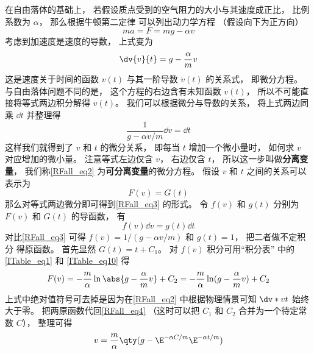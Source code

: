 

在自由落体的基础上， 若假设质点受到的空气阻力的大小与其速度成正比， 比例系数为 $\alpha$， 那么根据牛顿第二定律 可以列出动力学方程 （假设向下为正方向）
\begin{equation}
ma = F = mg - \alpha v
\end{equation}
考虑到加速度是速度的导数， 上式变为
\begin{equation}\label{RFall_eq2}
\dv{v}{t} = g - \frac{\alpha}{m} v
\end{equation}
这是速度关于时间的函数 $v(t)$ 与其一阶导数 $\dot v(t)$ 的关系式， 即微分方程。 与自由落体问题不同的是， 这个方程的右边含有未知函数 $v(t)$， 所以不可能直接将等式两边积分解得 $v(t)$。 我们可以根据微分与导数的关系， 将上式两边同乘 $\dd{t}$ 并整理得
\begin{equation}\label{RFall_eq3}
\frac{1}{g - \alpha v/m} \dd{v} = \dd{t}
\end{equation}
这样我们就得到了 $v$ 和 $t$ 的微分关系， 即每当 $t$ 增加一个微小量时， 如何求 $v$ 对应增加的微小量。 注意等式左边仅含 $v$， 右边仅含 $t$， 所以这一步叫做\textbf{分离变量}， 我们称\autoref{RFall_eq2} 为\textbf{可分离变量}的微分方程。 假设 $v$ 和 $t$ 之间的关系可以表示为
\begin{equation}\label{RFall_eq4}
F(v) = G(t)
\end{equation}
那么对等式两边微分即可得到\autoref{RFall_eq3} 的形式。 令 $f(v)$ 和 $g(t)$ 分别为 $F(v)$ 和 $G(t)$ 的导函数， 有
\begin{equation}\label{RFall_eq5}
f(v) \dd{v} = g(t) \dd{t}
\end{equation}
对比\autoref{RFall_eq3} 可得 $f(v) = 1/(g - \alpha v/m)$ 和 $g(t) = 1$， 把二者做不定积分 得原函数。 首先显然 $G(t) = t + C_1$。 对 $f(v)$ 积分可用“积分表” 中的\autoref{ITable_eq1} 和 \autoref{ITable_eq10} 得
\begin{equation}
F(v) = -\frac{m}{\alpha} \ln\abs{g - \frac{\alpha}{m} v} + C_2 = -\frac{m}{\alpha} \ln(g - \frac{\alpha}{m} v) + C_2
\end{equation}
 上式中绝对值符号可去掉是因为在\autoref{RFall_eq2} 中根据物理情景可知 $\dv*{v}{t}$ 始终大于零。 把两原函数代回\autoref{RFall_eq4} （这时可以把 $C_1$ 和 $C_2$ 合并为一个待定常数 $C$）， 整理可得
\begin{equation}
v = \frac{m}{\alpha} \qty( g - \E^{-\alpha C/m} \E^{-\alpha t/m} )
\end{equation}
